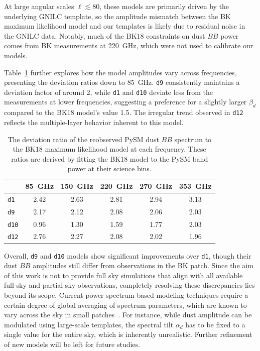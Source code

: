 \documentclass[twocolumn]{aastex631}
\begin{document}
At large angular scales $\ell \lesssim 80$, these models are primarily driven by the underlying GNILC template, so the amplitude mismatch between the BK maximum likelihood model and our templates is likely due to residual noise in the GNILC data. Notably, much of the BK18 constraints on dust $BB$ power comes from BK measurements at 220~GHz, which were not used to calibrate our models.

Table~\ref{tab:BB_dustratio} further explores how the model amplitudes vary across frequencies, presenting the deviation ratios down to 85~GHz. \texttt{d9} consistently maintains a deviation factor of around 2, while \texttt{d1} and \texttt{d10} deviate less from the measurements at lower frequencies, suggesting a preference for a slightly larger $\beta_d$ compared to the BK18 model's value 1.5. The irregular trend observed in \texttt{d12} reflects the multiple-layer behavior inherent to this model. 

\begin{table}
    \centering
    \begin{tabular}{lccccc}
    \toprule 
     & 85~GHz & 150~GHz & 220~GHz & 270~GHz & 353~GHz \\
    \midrule
    \texttt{d1}  & 2.42	& 2.63 & 2.81 & 2.94 & 3.13 \\
    \texttt{d9}  & 2.17 & 2.12 & 2.08 & 2.06 & 2.03 \\
    \texttt{d10} & 0.96 & 1.30 & 1.59 & 1.77 & 2.03 \\
    \texttt{d12} & 2.76	& 2.27 & 2.08 & 2.02 & 1.96 \\
   \bottomrule
    \end{tabular}
    \caption{The deviation ratio of the reobserved PySM dust $BB$ spectrum to the BK18 maximum likelihood model at each frequency. These ratios are derived by fitting the BK18 model to the PySM band power at their science bins.}
    \label{tab:BB_dustratio}
\end{table}

Overall, \texttt{d9} and \texttt{d10} models show significant improvements over \texttt{d1}, though their dust $BB$ amplitudes still differ from observations in the BK patch. Since the aim of this work is not to provide full sky simulations that align with all available full-sky and partial-sky observations, completely resolving these discrepancies lies beyond its scope. Current power spectrum-based modeling techniques require a certain degree of global averaging of spectrum parameters, which are known to vary across the sky in small patches~\citep{planck2016-l04}. For instance, while dust amplitude can be modulated using large-scale templates, the spectral tilt $\alpha_d$ has to be fixed to a single value for the entire sky, which is inherently unrealistic. Further refinement of new models will be left for future studies. 
\end{document}
